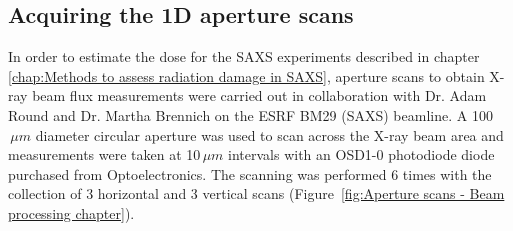 \subsection{Acquiring the 1D aperture scans}
\label{sub:Acquiring the 1D aperture scans}
In order to estimate the dose for the SAXS experiments described in chapter \ref{chap:Methods to assess radiation damage in SAXS}, aperture scans to obtain X-ray beam flux measurements were carried out in collaboration with Dr. Adam Round and Dr. Martha Brennich on the ESRF BM29 (SAXS) beamline.
A 100$\,\mu m$ diameter circular aperture was used to scan across the X-ray beam area and measurements were taken at 10$\,\mu m$ intervals with an OSD1-0 photodiode diode purchased from Optoelectronics.
The scanning was performed 6 times with the collection of 3 horizontal and 3 vertical scans (Figure~\ref{fig:Aperture scans - Beam processing chapter}).

